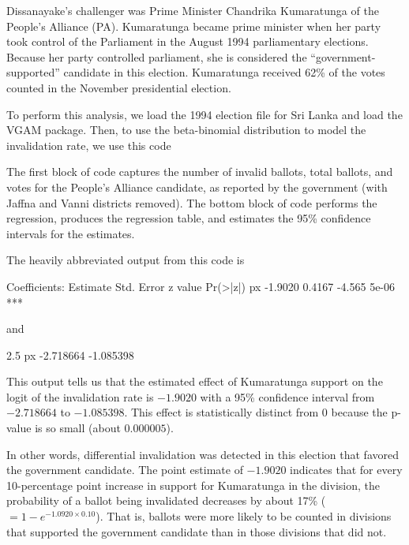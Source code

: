 Dissanayake's challenger was Prime Minister Chandrika Kumaratunga of the People's Alliance (PA). Kumaratunga became prime minister when her party took control of the Parliament in the August 1994 parliamentary elections. Because her party controlled parliament, she is considered the ``government-supported'' candidate in this election. Kumaratunga received 62\% of the votes counted in the November presidential election.\cite{state-2004}

To perform this analysis, we load the 1994 election file for Sri Lanka and load the VGAM package. Then, to use the beta-binomial distribution to model the invalidation rate, we use this code

\noindent
The first block of code captures the number of invalid ballots, total ballots, and votes for the People's Alliance candidate, as reported by the government (with Jaffna and Vanni districts removed). The bottom block of code performs the regression, produces the regression table, and estimates the 95\% confidence intervals for the estimates.

The heavily abbreviated output from this code is
\begin{codeout}
Coefficients:
              Estimate Std. Error z value Pr(>|z|)
px             -1.9020     0.4167  -4.565    5e-06 ***
\end{codeout}

\noindent
and

\begin{codeout}
                  2.5 %
px            -2.718664 -1.085398
\end{codeout}

\noindent
This  output tells us that the estimated effect of Kumaratunga support on the logit of the invalidation rate is $-1.9020$ with a 95\% confidence interval from $-2.718664$ to $-1.085398$. This effect is statistically distinct from $0$ because the p-value is so small (about $0.000005$).

In other words, differential invalidation was detected in this election that favored the government candidate. The point estimate of $-1.9020$ indicates that for every 10-percentage point increase in support for Kumaratunga in the division, the probability of a ballot being invalidated decreases by about 17\% ($=1-e^{-1.0920 }$). That is, ballots were more likely to be counted in divisions that supported the government candidate than in those divisions that did not.

